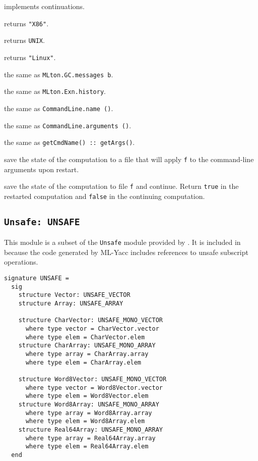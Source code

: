 \begin{description}

 implements continuations.

returns {\tt "X86"}.

returns {\tt UNIX}.

returns {\tt "Linux"}.

the same as {\tt MLton.GC.messages b}.

the same as {\tt MLton.Exn.history}.

the same as {\tt CommandLine.name ()}.

the same as {\tt CommandLine.arguments ()}.

the same as {\tt getCmdName() :: getArgs()}.

save the state of the computation to a file that will apply {\tt f} to
the command-line arguments upon restart.

save the state of the computation to file {\tt f} and continue.
Return {\tt true} in the restarted computation and {\tt false} in the
continuing computation.

\end{description}

\subsection{{\tt Unsafe: UNSAFE}}

This module is a subset of the {\tt Unsafe} module provided by
{\smlnj}.  It is included in {\mlton} because the code generated by
ML-Yacc includes references to unsafe subscript operations.

\begin{verbatim}
signature UNSAFE =
  sig
    structure Vector: UNSAFE_VECTOR
    structure Array: UNSAFE_ARRAY

    structure CharVector: UNSAFE_MONO_VECTOR
      where type vector = CharVector.vector
      where type elem = CharVector.elem
    structure CharArray: UNSAFE_MONO_ARRAY
      where type array = CharArray.array
      where type elem = CharArray.elem

    structure Word8Vector: UNSAFE_MONO_VECTOR
      where type vector = Word8Vector.vector
      where type elem = Word8Vector.elem
    structure Word8Array: UNSAFE_MONO_ARRAY
      where type array = Word8Array.array
      where type elem = Word8Array.elem
    structure Real64Array: UNSAFE_MONO_ARRAY
      where type array = Real64Array.array
      where type elem = Real64Array.elem
  end
\end{verbatim}
